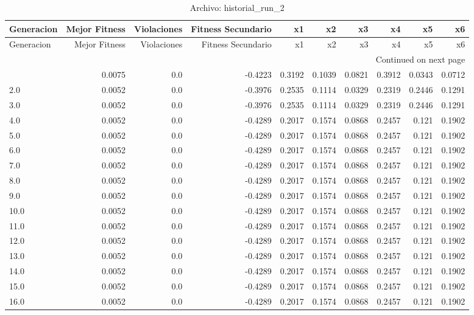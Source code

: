\begin{longtable}{lrrrrrrrrr}
\caption{Archivo: historial\_run\_2}\label{tab:historial_run_2} \\
\toprule
Generacion & Mejor Fitness & Violaciones & Fitness Secundario & x1 & x2 & x3 & x4 & x5 & x6 \\
\midrule
\endfirsthead
\toprule
Generacion & Mejor Fitness & Violaciones & Fitness Secundario & x1 & x2 & x3 & x4 & x5 & x6 \\
\midrule
\endhead
\midrule
\multicolumn{10}{r}{Continued on next page} \\
\midrule
\endfoot
\bottomrule
\endlastfoot
1.0 & 0.0075 & 0.0 & -0.4223 & 0.3192 & 0.1039 & 0.0821 & 0.3912 & 0.0343 & 0.0712 \\
2.0 & 0.0052 & 0.0 & -0.3976 & 0.2535 & 0.1114 & 0.0329 & 0.2319 & 0.2446 & 0.1291 \\
3.0 & 0.0052 & 0.0 & -0.3976 & 0.2535 & 0.1114 & 0.0329 & 0.2319 & 0.2446 & 0.1291 \\
4.0 & 0.0052 & 0.0 & -0.4289 & 0.2017 & 0.1574 & 0.0868 & 0.2457 & 0.121 & 0.1902 \\
5.0 & 0.0052 & 0.0 & -0.4289 & 0.2017 & 0.1574 & 0.0868 & 0.2457 & 0.121 & 0.1902 \\
6.0 & 0.0052 & 0.0 & -0.4289 & 0.2017 & 0.1574 & 0.0868 & 0.2457 & 0.121 & 0.1902 \\
7.0 & 0.0052 & 0.0 & -0.4289 & 0.2017 & 0.1574 & 0.0868 & 0.2457 & 0.121 & 0.1902 \\
8.0 & 0.0052 & 0.0 & -0.4289 & 0.2017 & 0.1574 & 0.0868 & 0.2457 & 0.121 & 0.1902 \\
9.0 & 0.0052 & 0.0 & -0.4289 & 0.2017 & 0.1574 & 0.0868 & 0.2457 & 0.121 & 0.1902 \\
10.0 & 0.0052 & 0.0 & -0.4289 & 0.2017 & 0.1574 & 0.0868 & 0.2457 & 0.121 & 0.1902 \\
11.0 & 0.0052 & 0.0 & -0.4289 & 0.2017 & 0.1574 & 0.0868 & 0.2457 & 0.121 & 0.1902 \\
12.0 & 0.0052 & 0.0 & -0.4289 & 0.2017 & 0.1574 & 0.0868 & 0.2457 & 0.121 & 0.1902 \\
13.0 & 0.0052 & 0.0 & -0.4289 & 0.2017 & 0.1574 & 0.0868 & 0.2457 & 0.121 & 0.1902 \\
14.0 & 0.0052 & 0.0 & -0.4289 & 0.2017 & 0.1574 & 0.0868 & 0.2457 & 0.121 & 0.1902 \\
15.0 & 0.0052 & 0.0 & -0.4289 & 0.2017 & 0.1574 & 0.0868 & 0.2457 & 0.121 & 0.1902 \\
16.0 & 0.0052 & 0.0 & -0.4289 & 0.2017 & 0.1574 & 0.0868 & 0.2457 & 0.121 & 0.1902 \\

\end{longtable}
